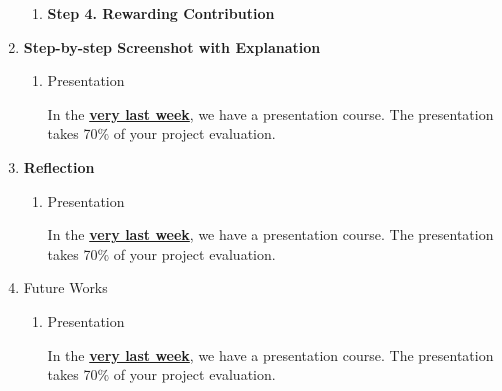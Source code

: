 \documentclass[12pt]{article}
\renewcommand{\_}{\kern-1.5pt\textunderscore\kern-1.5pt}
\begin{document}
\begin{enumerate}
\begin{enumerate}
		     \item \textbf{Step 4. Rewarding Contribution}\par
		     
		     
		            
	      \end{enumerate}
	      
	\item \textbf{Step-by-step Screenshot with Explanation}\par

	      \begin{enumerate}
		      \item Presentation\par

		            In the \textbf{\uline{very last week}}, we have a presentation course. The presentation takes 70$\%$  of your project evaluation. \par


		            \vspace{\baselineskip}

	      \end{enumerate}

	\item \textbf{Reflection}\par

	      \begin{enumerate}
		      \item Presentation\par

		            In the \textbf{\uline{very last week}}, we have a presentation course. The presentation takes 70$\%$  of your project evaluation. \par


		            \vspace{\baselineskip}

	      \end{enumerate}

	\item Future Works\par

	      \begin{enumerate}
		      \item Presentation\par

		            In the \textbf{\uline{very last week}}, we have a presentation course. The presentation takes 70$\%$  of your project evaluation. \par



\end{enumerate}
\end{enumerate}
\end{document}
